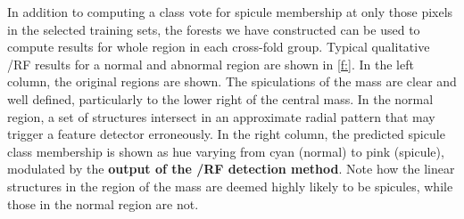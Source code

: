 In addition to computing a class vote for spicule membership at only those pixels in the selected training sets, the forests we have constructed can be used to compute results for whole region in each cross-fold group. Typical qualitative \dtcwt{}/RF results for a normal and abnormal region are shown in \ref{f:}. In the left column, the original regions are shown. The spiculations of the mass are clear and well defined, particularly to the lower right of the central mass. In the normal region, a set of structures intersect in an approximate radial pattern that may trigger a feature detector erroneously. In the right column, the predicted spicule class membership is shown as hue varying from cyan (normal) to pink (spicule), modulated by the \textbf{output of the \dtcwt{}/RF detection method}. Note how the linear structures in the region of the mass are deemed highly likely to be spicules, while those in the normal region are not. 


